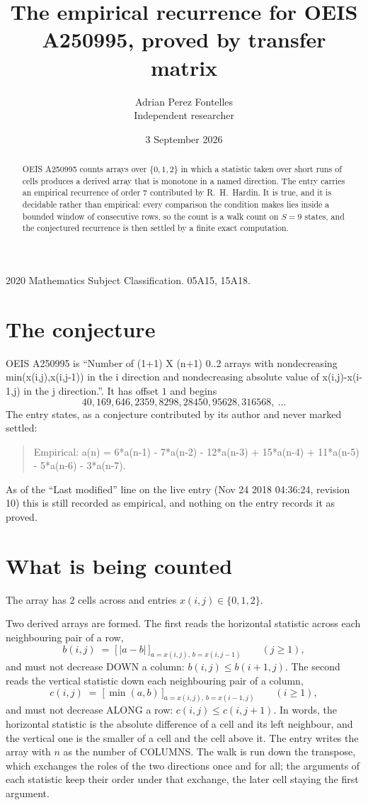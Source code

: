 \documentclass[11pt,a4paper]{article}
\title{The empirical recurrence for OEIS A250995, proved by transfer matrix}
\author{Adrian Perez Fontelles\\ \small Independent researcher}
\date{3 September 2026}
\theoremstyle{plain}
\theoremstyle{definition}
\begin{document}
\maketitle

\begin{abstract}
OEIS A250995 counts arrays over $\{0,1,2\}$ in which a statistic taken over short runs
of cells produces a derived array that is monotone in a named direction. The entry carries an
empirical recurrence of order $7$ contributed by R.~H.~Hardin. It is true, and it is
decidable rather than empirical: every comparison the condition makes lies inside a bounded
window of consecutive rows, so the count is a walk count on $S=9$ states, and the
conjectured recurrence is then settled by a finite exact computation.
\end{abstract}

\noindent\small 2020 Mathematics Subject Classification. 05A15, 15A18.\normalsize

\section{The conjecture}

OEIS A250995 is ``Number of (1+1) X (n+1) 0..2 arrays with nondecreasing min(x(i,j),x(i,j-1)) in the i direction and nondecreasing absolute value of x(i,j)-x(i-1,j) in the j direction.''. It has offset $1$ and begins
\[
40, 169, 646, 2359, 8298, 28450, 95628, 316568,\ \dots
\]
The entry states, as a conjecture contributed by its author and never marked settled:
\begin{quote}
Empirical: a(n) = 6*a(n-1) - 7*a(n-2) - 12*a(n-3) + 15*a(n-4) + 11*a(n-5) - 5*a(n-6) - 3*a(n-7).
\end{quote}
As of the ``Last modified'' line on the live entry (Nov 24 2018 04:36:24, revision 10) this is still
recorded as empirical, and nothing on the entry records it as proved.

\section{What is being counted}

The array has $2$ cells across and entries $x(i,j)\in\{0,1,2\}$.

Two derived arrays are formed. The first reads the horizontal statistic across each
neighbouring pair of a row,
\[
b(i,j)\;=\;\bigl[\,\lvert a-b\rvert\,\bigr]_{a=x(i,j),\,b=x(i,j-1)}\qquad (j\ge1),
\]
and must not decrease DOWN a column: $b(i,j)\le b(i{+}1,j)$. The second reads the vertical
statistic down each neighbouring pair of a column,
\[
c(i,j)\;=\;\bigl[\,\min(a,b)\,\bigr]_{a=x(i,j),\,b=x(i{-}1,j)}\qquad (i\ge1),
\]
and must not decrease ALONG a row: $c(i,j)\le c(i,j{+}1)$. In words, the horizontal statistic
is the absolute difference of a cell and its left neighbour, and the vertical one is
the smaller of a cell and the cell above it. The entry writes the array with $n$ as the number of COLUMNS. The walk is run down the transpose, which exchanges the roles of the two directions once and for all; the arguments of each statistic keep their order under that exchange, the later cell staying the first argument.
\end{document}
